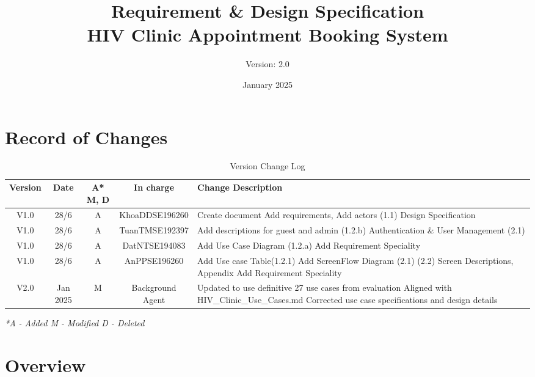 \documentclass[12pt,a4paper]{article}
\title{\textbf{Requirement \& Design Specification\\HIV Clinic Appointment Booking System}}
\author{Version: 2.0}
\date{January 2025}
\begin{document}
\maketitle
\thispagestyle{empty}

\newpage

\section*{Record of Changes}

\begin{table}[h!]
\centering
\renewcommand{\arraystretch}{1.5}
\begin{tabular}{|c|c|c|c|p{7.5cm}|}
\hline
\textbf{Version} & \textbf{Date} & \textbf{A* M, D} & \textbf{In charge} & \textbf{Change Description} \\
\hline
V1.0 & 28/6 & A & KhoaDDSE196260 & 
Create document \newline
Add requirements, Add actors (1.1) \newline
Design Specification\\
\hline
V1.0 & 28/6 & A & TuanTMSE192397 & 
Add descriptions for guest and admin (1.2.b) \newline
Authentication \& User Management (2.1) \\
\hline
V1.0 & 28/6 & A & DatNTSE194083 & 
Add Use Case Diagram (1.2.a)\newline 
Add Requirement Speciality
\\
\hline
V1.0 & 28/6 & A & AnPPSE196260 & 
Add Use case Table(1.2.1)
Add ScreenFlow Diagram (2.1) \newline
(2.2) Screen Descriptions, Appendix\newline 
Add Requirement Speciality\\
\hline
V2.0 & Jan 2025 & M & Background Agent & 
Updated to use definitive 27 use cases from evaluation \newline
Aligned with HIV\_Clinic\_Use\_Cases.md \newline
Corrected use case specifications and design details\\
\hline
\end{tabular}
\caption{Version Change Log}
\label{tab:version-log}
\end{table}

\textit{*A - Added M - Modified D - Deleted}

\newpage

\tableofcontents

\newpage

\section{Overview}
\end{document}

